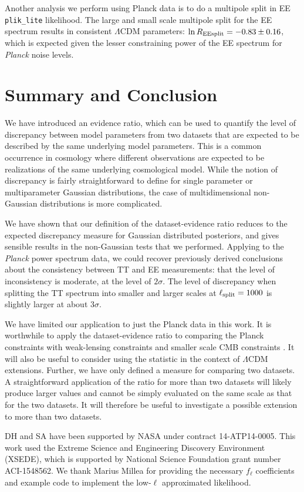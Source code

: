 \documentclass[amsmath, prd, reprint, aps]{revtex4-1}
\begin{document}
Another analysis we perform using Planck data is to do a multipole split in EE {\tt plik\_lite} likelihood. The large and small scale multipole split for the EE spectrum results in consistent $\Lambda$CDM parameters: $\ln R_{\rm EEsplit}=-0.83\pm 0.16$, which is expected given the lesser constraining power of the EE spectrum for {\it Planck} noise levels. %

\section{Summary and Conclusion} \label{sec:summary}
We have introduced an evidence ratio, which can be used to quantify the level of discrepancy between model parameters from two datasets that are expected to be described by the same underlying model parameters. This is a common occurrence in cosmology where different observations are expected to be realizations of the same underlying cosmological model. While the notion of discrepancy is fairly straightforward to define for single parameter or multiparameter Gaussian distributions, the case of multidimensional non-Gaussian distributions is more complicated. 

We have shown that our definition of the dataset-evidence ratio reduces to the expected discrepancy measure for Gaussian distributed posteriors, and gives sensible results in the non-Gaussian tests that we performed. Applying to the {\it Planck} power spectrum data, we could recover previously derived conclusions about the consistency between TT and EE measurements: that the level of inconsistency is moderate, at the level of $2 \sigma$. The level of discrepancy when splitting the TT spectrum into smaller and larger scales at $\ell_{\rm split}=1000$ is slightly larger at about $3\sigma$.

We have limited our application to just the Planck data in this work. It is worthwhile to apply the dataset-evidence ratio to comparing the Planck constraints with weak-lensing constraints \cite{Abbott:2017wau} and smaller scale CMB constraints \cite{Aylor:2017haa}. It will also be useful to consider using the statistic in the context of $\Lambda$CDM extensions. Further, we have only defined a measure for comparing two datasets. A straightforward application of the ratio for more than two datasets will likely produce larger values and cannot be simply evaluated on the same scale as that for the two datasets. It will therefore be useful to investigate a possible extension to more than two datasets. 

\begin{acknowledgments}
DH and SA have been supported by NASA under contract 14-ATP14-0005. This work used the Extreme Science and Engineering Discovery Environment (XSEDE), which is supported by National Science Foundation grant number ACI-1548562. We thank Marius Millea for providing the necessary $f_\ell$ coefficients and example code to implement the low-$\ell$ approximated likelihood.
\end{acknowledgments}


\end{document}

